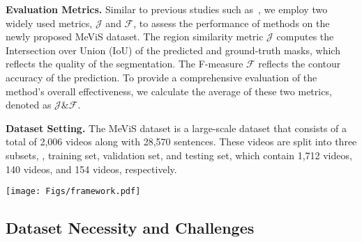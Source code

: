 \documentclass[10pt,twocolumn,letterpaper]{article}
\newcommand{\myparagraph}[1]{{\vspace{.5em} \noindent \bf #1}}
\newcommand{\numvideo}{2,006\xspace}
\newcommand{\numsentence}{28,570\xspace}
\newcommand{\ourdataset}{MeViS\xspace}
\newcommand{\ourmodel}{LMPM\xspace}
\begin{document}
\myparagraph{Evaluation Metrics.} Similar to previous studies such as~\cite{khoreva2018video,seo2020urvos}, we employ two widely used metrics, \(\mathcal{J}\) and \(\mathcal{F}\), to assess the performance of methods on the newly proposed \ourdataset dataset. The region similarity metric \(\mathcal{J}\) computes the Intersection over Union (IoU) of the predicted and ground-truth masks, which reflects the quality of the segmentation. The F-measure \(\mathcal{F}\) reflects the contour accuracy of the prediction. To provide a comprehensive evaluation of the method's overall effectiveness, we calculate the average of these two metrics, denoted as \(\mathcal{J\&F}\).


\myparagraph{Dataset Setting.} The \ourdataset dataset is a large-scale dataset that consists of a total of \numvideo videos along with \numsentence sentences. 
These videos are split into three subsets, \ie, training set, validation set, and testing set, which contain 1,712 videos, 140 videos, and 154 videos, respectively.


\begin{figure*}
    \centering
    \texttt{[image: Figs/framework.pdf]}
    \vspace{-5.6mm}
    \caption{The overview architecture of the proposed baseline approach Language-guided Motion Perception and Matching (\textbf{\ourmodel}). We first detect all possible target objects in each frame of the video and use object embeddings to represent them through Language-Guided Extractor. Then, Motion Perception is conducted on all the object embeddings of the video to grasp the global temporal context. By leveraging language queries and object embeddings with motion information, we generate object trajectories through a Transformer Decoder. Finally, we match the language features with the predicted object trajectories to identify the target object(s).}
    \label{fig:L-MAM}
    \vspace{-3mm}
\end{figure*}


\subsection{Dataset Necessity and Challenges}
\end{document}
